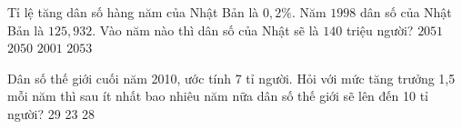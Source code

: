 \begin{vd}%
	Tỉ lệ tăng dân số hàng năm của Nhật Bản là $0,2\%$. Năm $1998$ dân số của Nhật Bản là $125,932$. Vào năm nào thì dân số của Nhật sẽ là $140$ triệu người?
	\newline
	\choice
	{\True $2051$}
	{$2050$}
	{$2001$}
	{$2053$}
\end{vd}

\begin{vd}%
	Dân số thế giới cuối năm 2010, ước tính 7 tỉ người. Hỏi với mức tăng trưởng 1,5 mỗi năm thì sau ít nhất bao nhiêu năm nữa dân số thế giới sẽ lên đến 10 tỉ người?\newline
	\choice
	{29}
	{23}
	{28}
	{}
\end{vd}